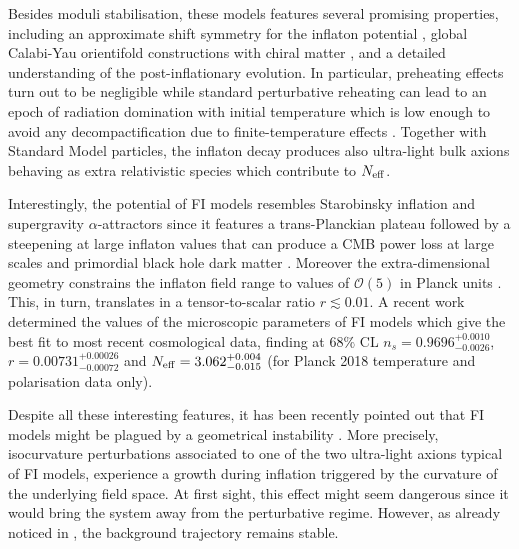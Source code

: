 \documentclass[aps,prd,a4paper,twocolumn,amsmath,showpacs,superscriptaddress,nofootinbib,preprintnumbers]{revtex4-1}
\newcommand{\mc}{\mathcal}
\begin{document}
Besides moduli stabilisation, these models features several promising properties, including an approximate shift symmetry for the inflaton potential \cite{Burgess:2016owb, Burgess:2014tja}, global Calabi-Yau orientifold constructions with chiral matter \cite{Cicoli:2011it, Cicoli:2016xae, Cicoli:2017axo}, and a detailed understanding of the post-inflationary evolution. In particular, preheating effects turn out to be negligible \cite{Antusch:2017flz} while standard perturbative reheating \cite{Cabella:2017zsa, Cicoli:2018cgu} can lead to an epoch of radiation domination with initial temperature which is low enough to avoid any decompactification due to finite-temperature effects \cite{Anguelova:2009ht}. Together with Standard Model particles, the inflaton decay produces also ultra-light bulk axions behaving as extra relativistic species which contribute to $N_{\rm eff}$. 

Interestingly, the potential of FI models resembles Starobinsky inflation \cite{Starobinsky:1980te} and supergravity $\alpha$-attractors \cite{Kallosh:2013maa,Kallosh:2017wku} since it features a trans-Planckian plateau followed by a steepening at large inflaton values that can produce a CMB power loss at large scales \cite{Cicoli:2013oba, Pedro:2013pba, Cicoli:2014bja} and primordial black hole dark matter \cite{Cicoli:2018asa}. Moreover the extra-dimensional geometry constrains the inflaton field range to values of $\mc{O}(5)$ in Planck units \cite{Cicoli:2018tcq}. This, in turn, translates in a tensor-to-scalar ratio $r \lesssim 0.01$. A recent work \cite{Cicoli:2020bao} determined the values of the microscopic parameters of FI models which give the best fit to most recent cosmological data, finding at $68\%$ CL $n_s = 0.9696^{+0.0010}_{-0.0026}$, $r = 0.00731^{+0.00026}_{-0.00072}$ and $N_{\rm eff} = 3.062^{+0.004}_{-0.015}$ (for Planck 2018 temperature and polarisation data only). 

Despite all these interesting features, it has been recently pointed out \cite{Cicoli:2018ccr, Cicoli:2019ulk} that FI models might be plagued by a geometrical instability \cite{Gong:2011uw,Renaux-Petel:2015mga}. More precisely, isocurvature perturbations associated to one of the two ultra-light axions typical of FI models, experience a growth during inflation triggered by the curvature of the underlying field space. At first sight, this effect might seem dangerous since it would bring the system away from the perturbative regime. However, as already noticed in \cite{Cicoli:2019ulk}, the background trajectory remains stable. 
\end{document}
